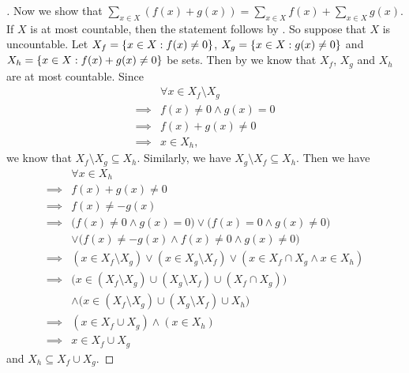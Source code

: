 \begin{proof}[]
  Now we show that \(\sum_{x \in X} (f(x) + g(x)) = \sum_{x \in X} f(x) + \sum_{x \in X} g(x)\).
  If \(X\) is at most countable, then the statement follows by .
  So suppose that \(X\) is uncountable.
  Let \(X_f = \left\lbrace x \in X : f(x) \neq 0\right\rbrace\), \(X_g = \left\lbrace x \in X : g(x) \neq 0\right\rbrace\) and \(X_h = \left\lbrace x \in X : f(x) + g(x) \neq 0\right\rbrace\) be sets.
  Then by  we know that \(X_f\), \(X_g\) and \(X_h\) are at most countable.
  Since
  \begin{align*}
             & \forall x \in X_f \setminus X_g \\
    \implies & f(x) \neq 0 \land g(x) = 0      \\
    \implies & f(x) + g(x) \neq 0              \\
    \implies & x \in X_h,
  \end{align*}
  we know that \(X_f \setminus X_g \subseteq X_h\).
  Similarly, we have \(X_g \setminus X_f \subseteq X_h\).
  Then we have
  \begin{align*}
             & \forall x \in X_h                                                                                  \\
    \implies & f(x) + g(x) \neq 0                                                                                 \\
    \implies & f(x) \neq -g(x)                                                                                    \\
    \implies & \big(f(x) \neq 0 \land g(x) = 0\big) \lor \big(f(x) = 0 \land g(x) \neq 0\big)                     \\
             & \lor \big(f(x) \neq -g(x) \land f(x) \neq 0 \land g(x) \neq 0\big)                                 \\
    \implies & (x \in X_f \setminus X_g) \lor (x \in X_g \setminus X_f) \lor (x \in X_f \cap X_g \land x \in X_h) \\
    \implies & \big(x \in (X_f \setminus X_g) \cup (X_g \setminus X_f) \cup (X_f \cap X_g)\big)                   \\
             & \land \big(x \in (X_f \setminus X_g) \cup (X_g \setminus X_f) \cup X_h\big)                        \\
    \implies & (x \in X_f \cup X_g) \land (x \in X_h)                                                             \\
    \implies & x \in X_f \cup X_g
  \end{align*}
  and \(X_h \subseteq X_f \cup X_g\).

\end{proof}
